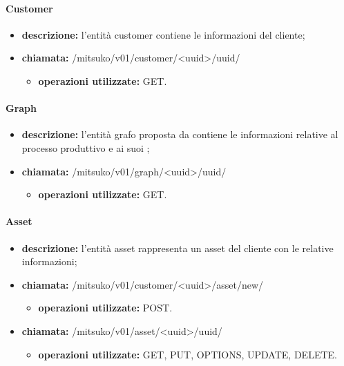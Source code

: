 	\paragraph{Customer}
	\begin{itemize}
		\item \textbf{descrizione:} l'entità customer contiene le informazioni del cliente;
		\item \textbf{chiamata:} /mitsuko/v01/customer/<uuid>/uuid/
		\begin{itemize}\item \textbf{operazioni utilizzate:} GET.\end{itemize}
	\end{itemize}
	
	\paragraph{Graph}
	\begin{itemize}
		\item \textbf{descrizione:} l'entità grafo proposta da \riskapp{} contiene le informazioni relative al processo produttivo e ai suoi ;
		\item \textbf{chiamata:} /mitsuko/v01/graph/<uuid>/uuid/
		\begin{itemize}\item \textbf{operazioni utilizzate:} GET.\end{itemize}
	\end{itemize}
	
	\paragraph{Asset}
	\begin{itemize}
		\item \textbf{descrizione:} l'entità asset rappresenta un asset del cliente con le relative informazioni;
		\item \textbf{chiamata:} /mitsuko/v01/customer/<uuid>/asset/new/
		\begin{itemize}\item \textbf{operazioni utilizzate:} POST.\end{itemize}
		\item \textbf{chiamata:} /mitsuko/v01/asset/<uuid>/uuid/
		\begin{itemize}\item \textbf{operazioni utilizzate:} GET, PUT, OPTIONS, UPDATE, DELETE.\end{itemize}
	\end{itemize}
	

